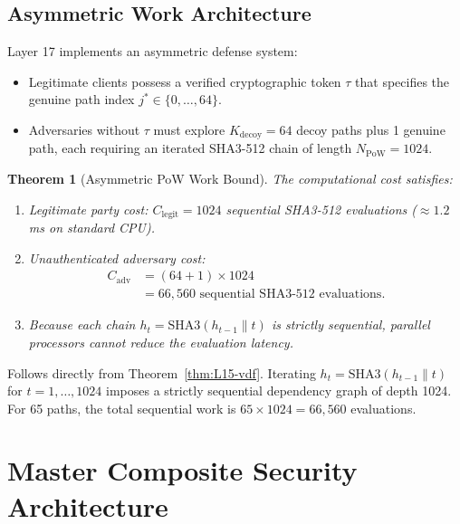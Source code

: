 \documentclass{ieeeaccess}
\newtheorem{theorem}{Theorem}
\newenvironment{proof}{\begin{IEEEproof}\IEEEQEDoff}{\end{IEEEproof}}
\begin{document}
\subsection{Asymmetric Work Architecture}
Layer 17 implements an asymmetric defense system:
\begin{itemize}
  \item Legitimate clients possess a verified cryptographic token $\tau$ that specifies the genuine path index $j^* \in \{0, \dots, 64\}$.
  \item Adversaries without $\tau$ must explore $K_{\mathrm{decoy}} = 64$ decoy paths plus 1 genuine path, each requiring an iterated SHA3-512 chain of length $N_{\mathrm{PoW}} = 1024$.
\end{itemize}

\begin{theorem}[Asymmetric PoW Work Bound]
\label{thm:L17-pow}
The computational cost satisfies:
\begin{enumerate}
  \item Legitimate party cost: $C_{\mathrm{legit}} = 1024$ sequential SHA3-512 evaluations ($\approx 1.2$ ms on standard CPU).
  \item Unauthenticated adversary cost:
  \begin{equation}
  \begin{aligned}
    C_{\mathrm{adv}} &= (64 + 1) \times 1024 \\
    &= 66{,}560 \text{ sequential SHA3-512 evaluations}.
  \end{aligned}
  \end{equation}
  \item Because each chain $h_t = \mathrm{SHA3}(h_{t-1} \parallel t)$ is strictly sequential, parallel processors cannot reduce the evaluation latency.
\end{enumerate}
\end{theorem}
\begin{proof}
Follows directly from Theorem~\ref{thm:L15-vdf}. Iterating $h_t = \mathrm{SHA3}(h_{t-1} \parallel t)$ for $t = 1, \dots, 1024$ imposes a strictly sequential dependency graph of depth 1024. For 65 paths, the total sequential work is $65 \times 1024 = 66{,}560$ evaluations.
\end{proof}

\section{Master Composite Security Architecture}
\label{sec:composite}
\end{document}
